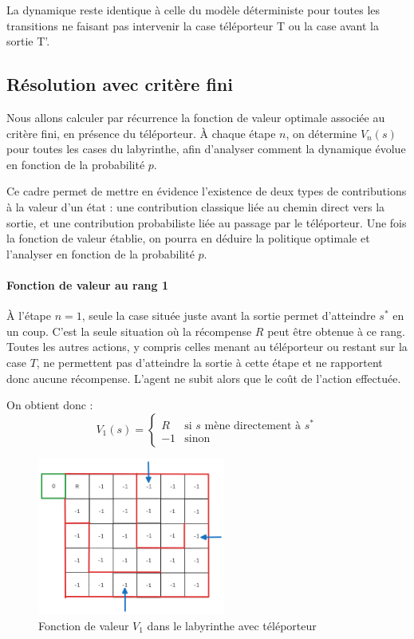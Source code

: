 \documentclass[12pt]{article}
\begin{document}
La dynamique reste identique à celle du modèle déterministe pour toutes les transitions ne faisant pas intervenir la case téléporteur T ou la case avant la sortie T'.

\subsection{Résolution avec critère fini}

Nous allons calculer par récurrence la fonction de valeur optimale associée au critère fini, en présence du téléporteur. À chaque étape \(n\), on détermine \(V_n(s)\) pour toutes les cases du labyrinthe, afin d’analyser comment la dynamique évolue en fonction de la probabilité \(p\).


Ce cadre permet de mettre en évidence l’existence de deux types de contributions à la valeur d’un état : une contribution classique liée au chemin direct vers la sortie, et une contribution probabiliste liée au passage par le téléporteur. Une fois la fonction de valeur établie, on pourra en déduire la politique optimale  et l’analyser en fonction de la probabilité \(p\).

\paragraph{Fonction de valeur au rang 1}

À l’étape \(n = 1\), seule la case située juste avant la sortie permet d’atteindre \(s^*\) en un coup. C’est la seule situation où la récompense \(R\) peut être obtenue à ce rang. Toutes les autres actions, y compris celles menant au téléporteur ou restant sur la case \(T\), ne permettent pas d’atteindre la sortie à cette étape et ne rapportent donc aucune récompense. L’agent ne subit alors que le coût de l’action effectuée.

On obtient donc :
\[
V_1(s) =
\begin{cases}
R & \text{si } s \text{ mène directement à } s^* \\
-1 & \text{sinon}
\end{cases}
\]


\begin{figure}[H]
    \centering
    \includegraphics[width=0.55\textwidth]{labyrinthev1.png}
    \caption{Fonction de valeur \(V_1\) dans le labyrinthe avec téléporteur}
\end{figure}
\end{document}
